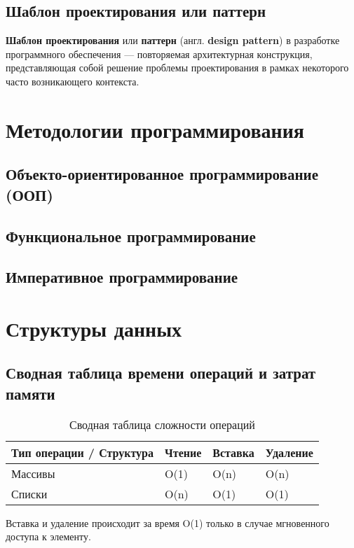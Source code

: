 \section{Шаблон проектирования или паттерн \label{idea:pattern}}
\textbf{Шаблон проектирования} или \textbf{паттерн} (англ. \textbf{design pattern}) в разработке программного обеспечения — повторяемая архитектурная конструкция, представляющая собой решение проблемы проектирования в рамках некоторого часто возникающего контекста.

\chapter{Методологии программирования}

\section{Объекто-ориентированное программирование (ООП) \label{method:oop} }
\section{Функциональное программирование\label{method:func}}
\section{Императивное программирование\label{method:imperat}}

\chapter{Структуры данных}

\section{Сводная таблица времени операций и затрат памяти}

\begin{table}[h!]
\caption{Сводная таблица сложности операций}
\begin{tabular}{|l|l|l|l|}
\hline
Тип операции / Структура & Чтение & Вставка & Удаление \\ \hline
Массивы 				 & O(1)   & O(n) 	& O(n)  \\ \hline
Списки 					 & O(n)   & O(1) 	& O(1) \\ \hline
\end{tabular}
\end{table}

Вставка и удаление происходит за время O(1) только в случае мгновенного доступа к элементу.

